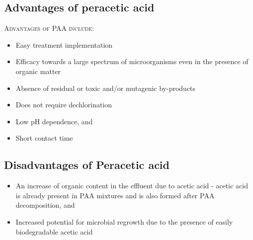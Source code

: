 \subsection{Advantages of peracetic acid}
			\begin{enumerate}
					\begin{itemize}
						\item Easy treatment implementation
						\item Efficacy towards a large spectrum of microorganisms even in the presence of organic matter
						\item Absence of residual or toxic and/or mutagenic by-products
						\item Does not require dechlorination
						\item Low pH dependence, and
						\item Short contact time
					\end{itemize}
\subsection{Disadvantages of Peracetic acid}
					\begin{itemize}
						\item An increase of organic content in the effluent due to acetic acid - acetic acid is already present in PAA mixtures and is also formed after PAA decomposition, and 
						\item Increased potential for microbial regrowth due to the presence of easily biodegradable acetic acid
					\end{itemize}
		\end{enumerate}
